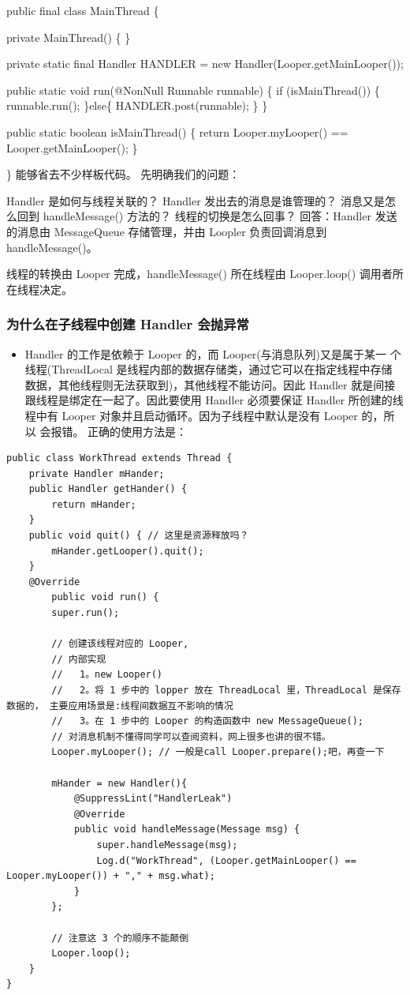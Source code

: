 \documentclass[9pt, b5paper]{article}
\begin{document}
public final class MainThread \{

private MainThread() \{
\}

private static final Handler HANDLER = new Handler(Looper.getMainLooper());

public static void run(@NonNull Runnable runnable) \{
    if (isMainThread()) \{
        runnable.run();
    \}else\{
        HANDLER.post(runnable);
    \}
\}

public static boolean isMainThread() \{
    return Looper.myLooper() == Looper.getMainLooper();
\}

\}
能够省去不少样板代码。
先明确我们的问题：

Handler 是如何与线程关联的？
Handler 发出去的消息是谁管理的？
消息又是怎么回到 handleMessage() 方法的？
线程的切换是怎么回事？
回答：Handler 发送的消息由 MessageQueue 存储管理，并由 Loopler 负责回调消息到 handleMessage()。

线程的转换由 Looper 完成，handleMessage() 所在线程由 Looper.loop() 调用者所在线程决定。
\subsubsection{为什么在子线程中创建 Handler 会抛异常}
\label{sec-2-3-5}
\begin{itemize}
\item Handler 的工作是依赖于 Looper 的，而 Looper(与消息队列)又是属于某一 个线程(ThreadLocal 是线程内部的数据存储类，通过它可以在指定线程中存储 数据，其他线程则无法获取到)，其他线程不能访问。因此 Handler 就是间接 跟线程是绑定在一起了。因此要使用 Handler 必须要保证 Handler 所创建的线 程中有 Looper 对象并且启动循环。因为子线程中默认是没有 Looper 的，所以 会报错。 正确的使用方法是：
\end{itemize}
\begin{verbatim}
public class WorkThread extends Thread {
    private Handler mHander;
    public Handler getHander() {
        return mHander;
    }
    public void quit() { // 这里是资源释放吗？
        mHander.getLooper().quit();
    }
    @Override
        public void run() {
        super.run();

        // 创建该线程对应的 Looper,
        // 内部实现
        //   1。new Looper()
        //   2。将 1 步中的 lopper 放在 ThreadLocal 里，ThreadLocal 是保存数据的， 主要应用场景是:线程间数据互不影响的情况
        //   3。在 1 步中的 Looper 的构造函数中 new MessageQueue();
        // 对消息机制不懂得同学可以查阅资料，网上很多也讲的很不错。
        Looper.myLooper(); // 一般是call Looper.prepare();吧，再查一下

        mHander = new Handler(){
            @SuppressLint("HandlerLeak")
            @Override
            public void handleMessage(Message msg) {
                super.handleMessage(msg);
                Log.d("WorkThread", (Looper.getMainLooper() == Looper.myLooper()) + "," + msg.what);
            }
        };
        
        // 注意这 3 个的顺序不能颠倒
        Looper.loop();
    }
}
\end{verbatim}
\end{document}
